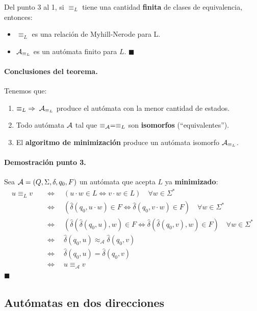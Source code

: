 Del punto 3 al 1, si $\equiv_L$ tiene una cantidad \textbf{finita} de clases de equivalencia, entonces:
\begin{itemize}
    \item $\equiv_L$ es una relación de Myhill-Nerode para L.
    \item $\mathcal{A}_{\equiv_L}$ es un autómata finito para $L$. \hfill $\blacksquare$
\end{itemize}

\paragraph{Conclusiones del teorema.} Tenemos que:
\begin{enumerate}
    \item $\equiv_L \; \Rightarrow \; \mathcal{A}_{\equiv_L}$ produce el autómata con la menor cantidad de estados.
    \item Todo autómata $\mathcal{A}$ tal que $\equiv_{\mathcal{A}} = \equiv_L$ son \textbf{isomorfos} (``equivalentes'').
    \item El \textbf{algoritmo de minimización} produce un autómata isomorfo $\mathcal{A}_{\equiv_L}$.
\end{enumerate}

\paragraph{Demostración punto 3.} Sea $\mathcal{A} = (Q,\Sigma,\delta,q_0,F)$ un autómata que acepta $L$ ya \textbf{minimizado}:
$$
    \begin{aligned}
        u \equiv_L v \quad & \Leftrightarrow \quad(u \cdot w \in L \Leftrightarrow v \cdot w \in L) \quad \forall w \in \Sigma^*                                                                                                          \\
                           & \Leftrightarrow \quad\left(\hat{\delta}\left(q_0, u \cdot w\right) \in F \Leftrightarrow \hat{\delta}\left(q_0, v \cdot w\right) \in F\right) \quad \forall w \in \Sigma^*                                         \\
                           & \Leftrightarrow \quad\left(\hat{\delta}\left(\hat{\delta}\left(q_0, u\right), w\right) \in F \Leftrightarrow \hat{\delta}\left(\hat{\delta}\left(q_0, v\right), w\right) \in F\right) \quad \forall w \in \Sigma^* \\
                           & \Leftrightarrow \quad \hat{\delta}\left(q_0, u\right) \approx_\mathcal{A} \hat{\delta}\left(q_0, v\right)                                                                                                          \\
                           & \Leftrightarrow \quad \hat{\delta}\left(q_0, u\right)=\hat{\delta}\left(q_0, v\right)                                                                                                                              \\
                           & \Leftrightarrow \quad u \equiv_\mathcal{A} v
    \end{aligned}
$$
\hfill $\blacksquare$

\subsection{Autómatas en dos direcciones}